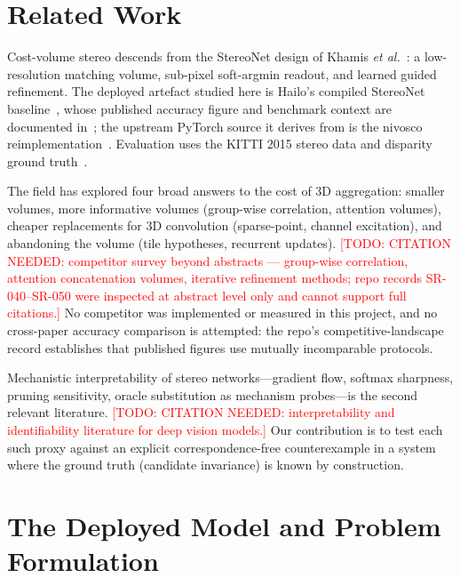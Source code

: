 \documentclass[conference]{IEEEtran}
\newcommand{\todo}[1]{\textcolor{red}{[TODO: #1]}}
\begin{document}
\section{Related Work}
\label{sec:related}

Cost-volume stereo descends from the StereoNet design of Khamis \emph{et al.}~\cite{khamis2018stereonet}: a low-resolution matching volume, sub-pixel soft-argmin readout, and learned guided refinement. The deployed artefact studied here is Hailo's compiled StereoNet baseline~\cite{hailo2023stereonet}, whose published accuracy figure and benchmark context are documented in~\cite{hailo2023benchmark}; the upstream PyTorch source it derives from is the nivosco reimplementation~\cite{nivosco_stereonet}. Evaluation uses the KITTI 2015 stereo data and disparity ground truth~\cite{geiger2015kitti}.

The field has explored four broad answers to the cost of 3D aggregation: smaller volumes, more informative volumes (group-wise correlation, attention volumes), cheaper replacements for 3D convolution (sparse-point, channel excitation), and abandoning the volume (tile hypotheses, recurrent updates). \todo{CITATION NEEDED: competitor survey beyond abstracts --- group-wise correlation, attention concatenation volumes, iterative refinement methods; repo records SR-040--SR-050 were inspected at abstract level only and cannot support full citations.} No competitor was implemented or measured in this project, and no cross-paper accuracy comparison is attempted: the repo's competitive-landscape record establishes that published figures use mutually incomparable protocols.

Mechanistic interpretability of stereo networks---gradient flow, softmax sharpness, pruning sensitivity, oracle substitution as mechanism probes---is the second relevant literature. \todo{CITATION NEEDED: interpretability and identifiability literature for deep vision models.} Our contribution is to test each such proxy against an explicit correspondence-free counterexample in a system where the ground truth (candidate invariance) is known by construction.

\section{The Deployed Model and Problem Formulation}
\label{sec:model}
\end{document}
